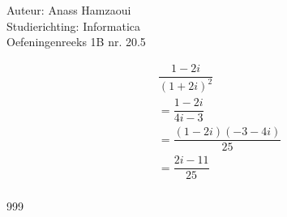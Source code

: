 \documentclass[a4paper]{article}
\begin{document}
  
\noindent \large Auteur: Anass Hamzaoui \\
\noindent \large Studierichting: Informatica \\
\noindent \large Oefeningenreeks 1B nr. 20.5 \\

\medskip

\normalsize

\begin{eqnarray*}
    && \dfrac{1 - 2i}{(1 + 2i)^2} \\
    && = \dfrac{1 - 2i}{4i - 3} \\
    && = \dfrac{(1 - 2i)(-3 - 4i)}{25} \\
    && = \dfrac{2i - 11}{25} \\
\end{eqnarray*}

\begin{thebibliography}{999}
\end{thebibliography}
\end{document}

